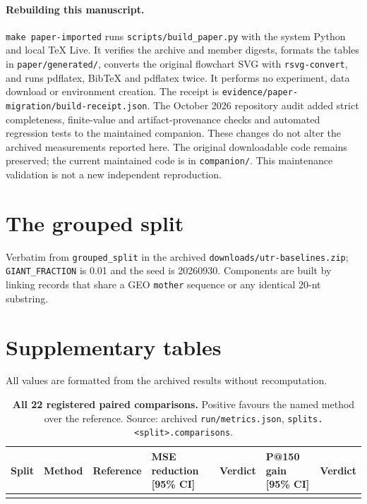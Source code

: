 \documentclass[11pt]{article}
\makeatletter
\newcommand{\m}[1]{\texttt{#1}}
\newcommand{\ci}[3]{#1 [#2, #3]}
\newcommand{\stackedci}{\renewcommand{\ci}[3]{\begin{tabular}[t]{@{}l@{}}##1\\ {}[##2, ##3]\end{tabular}}}
\makeatother
\begin{document}
\paragraph{Rebuilding this manuscript.} \m{make paper-imported} runs \m{scripts/build\_paper.py} with the system Python
and local TeX Live. It verifies the archive and member digests, formats the tables in \m{paper/generated/}, converts
the original flowchart SVG with \m{rsvg-convert}, and runs pdflatex, BibTeX and pdflatex twice. It performs no
experiment, data download or environment creation. The receipt is \m{evidence/paper-migration/build-receipt.json}.
The October 2026 repository audit added strict completeness, finite-value and artifact-provenance checks
and automated regression tests to the maintained companion. These changes do not alter the archived
measurements reported here. The original downloadable code remains preserved; the current maintained
code is in \m{companion/}. This maintenance validation is not a new independent reproduction.

\section{The grouped split}\label{app:code}
Verbatim from \m{grouped\_split} in the archived \m{downloads/utr-baselines.zip}; \m{GIANT\_FRACTION} is 0.01 and the seed is 20260930.
Components are built by linking records that share a GEO \m{mother} sequence or any identical 20-nt substring.


\section{Supplementary tables}\label{app:supp}
All values are formatted from the archived results without recomputation.

\begin{table}[!tbp]
\centering
\scriptsize
\setlength{\tabcolsep}{3pt}
\caption{\textbf{All 22 registered paired comparisons.} Positive favours the named method over the reference. Source:
archived \m{run/metrics.json}, \m{splits.<split>.comparisons}.}
\label{tab:comparisons-all}
\stackedci
\begin{tabular}{@{}l >{\raggedright\arraybackslash}p{2.4cm} >{\raggedright\arraybackslash}p{1.5cm} l >{\raggedright\arraybackslash}p{1.8cm} l >{\raggedright\arraybackslash}p{1.8cm}@{}}
\toprule
Split & Method & Reference & MSE reduction [95\% CI] & Verdict & P@150 gain [95\% CI] & Verdict \\
\midrule
{}{generated/tab_comparisons_all.tex}
\bottomrule
\end{tabular}
\end{table}
\end{document}
